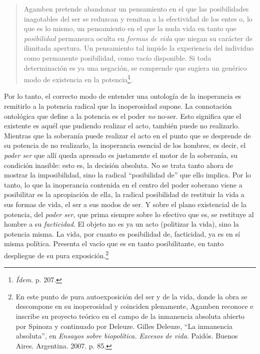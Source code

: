 \begin{quote}
Agamben pretende abandonar un pensamiento en el que las posibilidades inagotables del ser se reduzcan y remitan a la efectividad de los entes o, lo que es lo mismo, un pensamiento en el que la nuda vida en tanto que \emph{posibilidad} permanezca oculta en \emph{formas de vida} que niegan su carácter de ilimitada apertura. Un pensamiento tal impide la experiencia del individuo como permanente posibilidad, como vacío disponible. Si toda determinación es ya una negación, se comprende que sugiera un genérico modo de existencia en la potencia\footnote{\emph{Ídem}. p. 207.}.
\end{quote}

Por lo tanto, el correcto modo de entender una ontología de la inoperancia es remitirlo a la potencia radical que la inoperosidad supone. La connotación ontológica que define a la potencia es el poder \emph{no} no-ser. Esto significa que el existente es aquél que pudiendo realizar el acto, también puede no realizarlo. Mientras que la soberanía puede realizar el acto en el punto que se desprende de su potencia de no realizarlo, la inoperancia esencial de los hombres, es decir, el \emph{poder ser} que allí queda apresado es justamente el motor de la soberanía, su condición inasible: esto es, la decisión absoluta. No se trata tanto ahora de mostrar la imposibilidad, sino la radical \enquote{posibilidad de} que ello implica. Por lo tanto, lo que la inoperancia contenida en el centro del poder soberano viene a posibilitar es la apropiación de ella, la radical posibilidad de restituir la vida a sus formas de vida, el ser a sus modos de ser. Y sobre el plano existencial de la potencia, del \emph{poder ser,} que prima siempre sobre lo efectivo que es, se restituye al hombre a su \emph{facticidad}. El objeto no es ya un acto (politizar la vida), sino la potencia misma. La vida, por cuanto es posibilidad de, facticidad, ya es en sí misma política. Presenta el vacío que es en tanto posibilitante, en tanto despliegue de su pura exposición.\footnote{En este punto de pura autoexposición del ser y de la vida, donde la obra se descompone en su inoperosidad y coinciden plenamente, Agamben reconoce e inscribe su proyecto teórico en el campo de la inmanencia absoluta abierto por Spinoza y continuado por Deleuze. Gilles Deleuze, \enquote{La inmanencia absoluta}, en \emph{Ensayos sobre biopolítica. Excesos de vida}. Paidós. Buenos Aires. Argentina. 2007. p. 85.}

